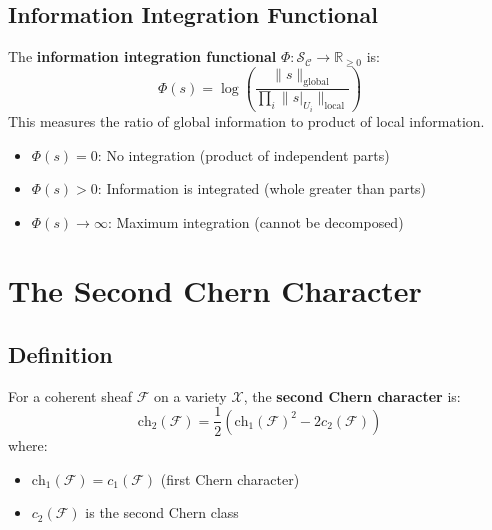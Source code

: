 \subsection{Information Integration Functional}

\begin{defn}\label{def:integration-measure}
The \textbf{information integration functional} $\Phi: \mathcal{S}_\mathcal{C} \to \mathbb{R}_{\geq 0}$ is:
\begin{equation}
\Phi(s) = \log\left(\frac{\|s\|_{\text{global}}}{\prod_i \|s|_{U_i}\|_{\text{local}}}\right)
\end{equation}
This measures the ratio of global information to product of local information.
\end{defn}

\begin{itemize}
\item $\Phi(s) = 0$: No integration (product of independent parts)
\item $\Phi(s) > 0$: Information is integrated (whole greater than parts)
\item $\Phi(s) \to \infty$: Maximum integration (cannot be decomposed)
\end{itemize}

\section{The Second Chern Character}
\label{sec:second-chern}

\subsection{Definition}

\begin{defn}\label{def:second-chern-char}
For a coherent sheaf $\mathcal{F}$ on a variety $\mathcal{X}$, the \textbf{second Chern character} is:
\begin{equation}
\boxed{\text{ch}_2(\mathcal{F}) = \frac{1}{2}\left(\text{ch}_1(\mathcal{F})^2 - 2c_2(\mathcal{F})\right)}
\end{equation}
where:
\begin{itemize}
\item $\text{ch}_1(\mathcal{F}) = c_1(\mathcal{F})$ (first Chern character)
\item $c_2(\mathcal{F})$ is the second Chern class
\end{itemize}
\end{defn}

